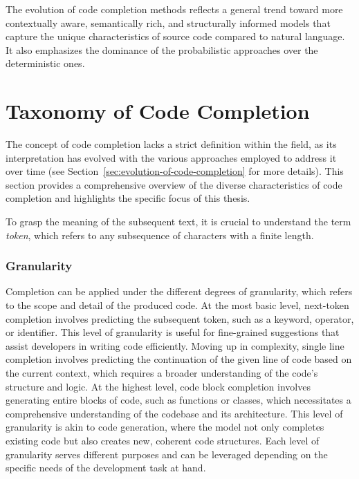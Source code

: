 The evolution of code completion methods reflects a general trend toward more contextually aware, semantically rich, and structurally informed models that capture the unique characteristics of source code compared to natural language. It also emphasizes the dominance of the probabilistic approaches over the deterministic ones.

\section{Taxonomy of Code Completion}

The concept of code completion lacks a strict definition within the field, as its interpretation has evolved with the various approaches employed to address it over time (see Section~\ref{sec:evolution-of-code-completion} for more details). This section provides a comprehensive overview of the diverse characteristics of code completion and highlights the specific focus of this thesis.

To grasp the meaning of the subsequent text, it is crucial to understand the term \textit{token}, which refers to any subsequence of characters with a finite length.  %

\subsubsection*{Granularity}

Completion can be applied under the different degrees of granularity, which refers to the scope and detail of the produced code. At the most basic level, next-token completion involves predicting the subsequent token, such as a keyword, operator, or identifier. This level of granularity is useful for fine-grained suggestions that assist developers in writing code efficiently. Moving up in complexity, single line completion involves predicting the continuation of the given line of code based on the current context, which requires a broader understanding of the code's structure and logic. At the highest level, code block completion involves generating entire blocks of code, such as functions or classes, which necessitates a comprehensive understanding of the codebase and its architecture. This level of granularity is akin to code generation, where the model not only completes existing code but also creates new, coherent code structures. Each level of granularity serves different purposes and can be leveraged depending on the specific needs of the development task at hand.

